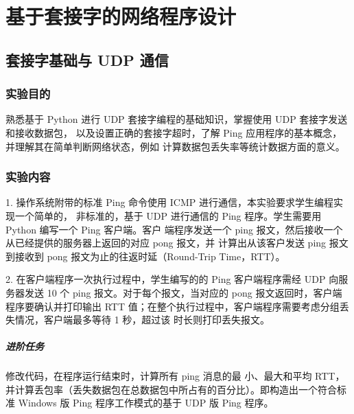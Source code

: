 \documentclass[a4paper,12pt]{report}
\begin{document}
\chapter*{基于套接字的网络程序设计
}
\setcounter{page}{1}
\begin{spacing}{1.5}
\songti{}

\section{套接字基础与 UDP 通信}
\subsection{实验目的}
熟悉基于 Python 进行 UDP 套接字编程的基础知识，掌握使用 UDP 套接字发送和接收数据包， 以及设置正确的套接字超时，了解 Ping 应用程序的基本概念，并理解其在简单判断网络状态，例如 计算数据包丢失率等统计数据方面的意义。
\subsection{实验内容}
1. 操作系统附带的标准 Ping 命令使用 ICMP 进行通信，本实验要求学生编程实现一个简单的， 非标准的，基于 UDP 进行通信的 Ping 程序。学生需要用 Python 编写一个 Ping 客户端。客户 端程序发送一个 ping 报文，然后接收一个从已经提供的服务器上返回的对应 pong 报文，并 计算出从该客户发送 ping 报文到接收到 pong 报文为止的往返时延（Round-Trip Time，RTT）。

2. 在客户端程序一次执行过程中，学生编写的的 Ping 客户端程序需经 UDP 向服务器发送 10 个 ping 报文。对于每个报文，当对应的 pong 报文返回时，客户端程序要确认并打印输出 RTT 值；在整个执行过程中，客户端程序需要考虑分组丢失情况，客户端最多等待 1 秒，超过该 时长则打印丢失报文。

\paragraph*{进阶任务}
修改代码，在程序运行结束时，计算所有 ping 消息的最 小、最大和平均 RTT，并计算丢包率（丢失数据包在总数据包中所占有的百分比）。即构造出一个符合标准 Windows 版 Ping 程序工作模式的基于 UDP 版 Ping 程序。


\end{spacing}
\end{document}
